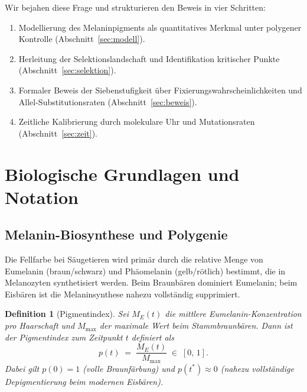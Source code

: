 ﻿\documentclass[12pt,a4paper]{article}
\newtheorem{definition}[theorem]{Definition}
\theoremstyle{remark}
\begin{document}
Wir bejahen diese Frage und strukturieren den Beweis in vier Schritten:
\begin{enumerate}
  \item Modellierung des Melaninpigments als quantitatives Merkmal
        unter polygener Kontrolle (Abschnitt~\ref{sec:modell}).
  \item Herleitung der Selektionslandschaft und Identifikation kritischer
        Punkte (Abschnitt~\ref{sec:selektion}).
  \item Formaler Beweis der Siebenstufigkeit \"{u}ber Fixierungswahrscheinlichkeiten
        und Allel-Substitutionsraten (Abschnitt~\ref{sec:beweis}).
  \item Zeitliche Kalibrierung durch molekulare Uhr und Mutationsraten
        (Abschnitt~\ref{sec:zeit}).
\end{enumerate}

\section{Biologische Grundlagen und Notation}

\subsection{Melanin-Biosynthese und Polygenie}

Die Fellfarbe bei S\"{a}ugetieren wird prim\"{a}r durch die relative Menge von
Eumelanin (braun/schwarz) und Ph\"{a}omelanin (gelb/r\"{o}tlich) bestimmt,
die in Melanozyten synthetisiert werden. Beim Braunb\"{a}ren dominiert
Eumelanin; beim Eisb\"{a}ren ist die Melaninsynthese nahezu vollst\"{a}ndig
supprimiert.

\begin{definition}[Pigmentindex]
\label{def:pigment}
Sei $M_E(t)$ die mittlere Eumelanin-Konzentration pro Haarschaft und
$M_{\max}$ der maximale Wert beim Stammbraunb\"{a}ren. Dann ist der
\emph{Pigmentindex} zum Zeitpunkt $t$ definiert als
\[
  p(t) \;=\; \frac{M_E(t)}{M_{\max}} \;\in\; [0,\,1].
\]
Dabei gilt $p(0) = 1$ (volle Braunf\"{a}rbung) und $p(t^*) \approx 0$
(nahezu vollst\"{a}ndige Depigmentierung beim modernen Eisb\"{a}ren).
\end{definition}
\end{document}

